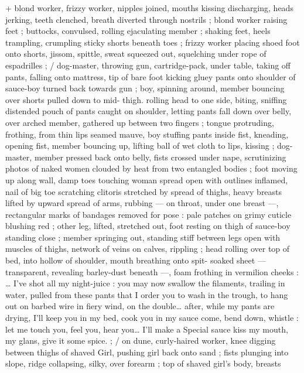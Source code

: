 + blond worker, frizzy worker, nipples joined, mouths kissing 
discharging, heads jerking, teeth clenched, breath diverted through 
nostrils ; blond worker raising feet ; buttocks, convulsed, rolling 
ejaculating member ; shaking feet, heels trampling, crumpling sticky 
shorts beneath toes ; frizzy worker placing shoed foot onto shorts, 
jissom, spittle, sweat squeezed out, squelching under rope of 
espadrilles ; {\slash} dog-master, throwing gun, cartridge-pack, under table, 
taking off pants, falling onto mattress, tip of bare foot kicking gluey 
pants onto shoulder of sauce-boy turned back towards gun ; boy, 
spinning around, member bouncing over shorts pulled down to mid- 
thigh. rolling head to one side, biting, sniffing distended pouch of 
pants caught on shoulder, letting pants fall down over belly, over 
arched member, gathered up between two fingers ; tongue 
protruding, frothing, from thin lips seamed mauve, boy stuffing pants 
inside fist, kneading, opening fist, member bouncing up, lifting ball 
of wet cloth to lips, kissing ; dog-master, member pressed back onto 
belly, fists crossed under nape, scrutinizing photos of naked women 
clouded by heat from two entangled bodies ; foot moving up along 
wall, damp toes touching woman spread open with outlines inflamed, 
nail of big toe scratching clitoris stretched by spread of thighs, 
heavy breasts lifted by upward spread of arms, rubbing --- on throat, 
under one breast ---, rectangular marks of bandages removed for 
pose : pale patches on grimy cuticle blushing red ; other leg, lifted, 
stretched out, foot resting on thigh of sauce-boy standing close ; 
member springing out, standing stiff between legs open with 
muscles of thighs, network of veins on calves, rippling ; head rolling 
over top of bed, into hollow of shoulder, mouth breathing onto spit- 
soaked sheet --- transparent, revealing barley-dust beneath ---, 
foam frothing in vermilion cheeks : {\td} {\gl} {\ldots} I've shot all my night-juice 
: you may now swallow the filaments, trailing in water, pulled from 
these pants that I order you to wash in the trough, to hang out on 
barbed wire in fiery wind, on the double{\ldots} after, while my pants are 
drying, I'll keep you in my bed, cook you in my sauce{\td} come, bend 
down, whistle : let me touch you, feel you, hear you{\ldots} I'll make a 
Special sauce{\td} kiss my mouth, my glans, give it some spice.{\gr} ; {\slash} on 
dune, curly-haired worker, knee digging between thighs of shaved 
Girl, pushing girl back onto sand ; fists plunging into slope, ridge 
collapsing, silky, over forearm ; top of shaved girl's body, breasts 
